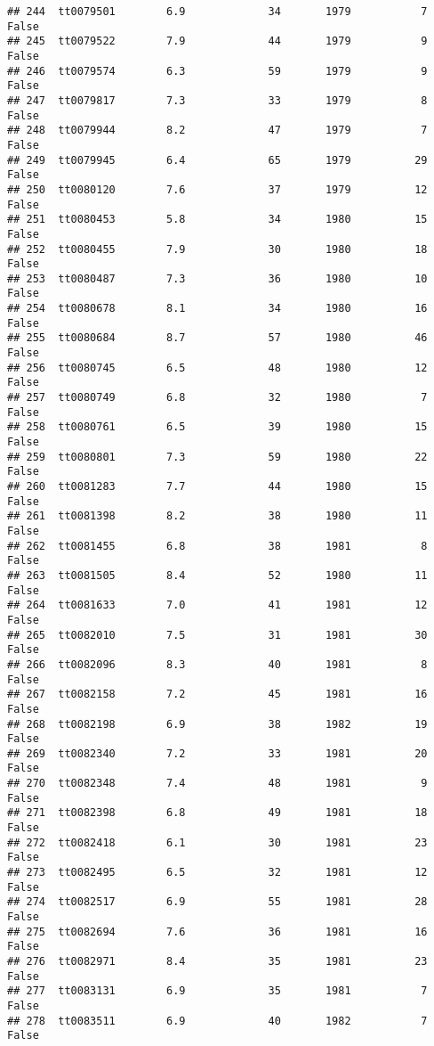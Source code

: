 \documentclass[
]{article}
\begin{document}
\begin{verbatim}
## 244  tt0079501        6.9             34       1979           7   False
## 245  tt0079522        7.9             44       1979           9   False
## 246  tt0079574        6.3             59       1979           9   False
## 247  tt0079817        7.3             33       1979           8   False
## 248  tt0079944        8.2             47       1979           7   False
## 249  tt0079945        6.4             65       1979          29   False
## 250  tt0080120        7.6             37       1979          12   False
## 251  tt0080453        5.8             34       1980          15   False
## 252  tt0080455        7.9             30       1980          18   False
## 253  tt0080487        7.3             36       1980          10   False
## 254  tt0080678        8.1             34       1980          16   False
## 255  tt0080684        8.7             57       1980          46   False
## 256  tt0080745        6.5             48       1980          12   False
## 257  tt0080749        6.8             32       1980           7   False
## 258  tt0080761        6.5             39       1980          15   False
## 259  tt0080801        7.3             59       1980          22   False
## 260  tt0081283        7.7             44       1980          15   False
## 261  tt0081398        8.2             38       1980          11   False
## 262  tt0081455        6.8             38       1981           8   False
## 263  tt0081505        8.4             52       1980          11   False
## 264  tt0081633        7.0             41       1981          12   False
## 265  tt0082010        7.5             31       1981          30   False
## 266  tt0082096        8.3             40       1981           8   False
## 267  tt0082158        7.2             45       1981          16   False
## 268  tt0082198        6.9             38       1982          19   False
## 269  tt0082340        7.2             33       1981          20   False
## 270  tt0082348        7.4             48       1981           9   False
## 271  tt0082398        6.8             49       1981          18   False
## 272  tt0082418        6.1             30       1981          23   False
## 273  tt0082495        6.5             32       1981          12   False
## 274  tt0082517        6.9             55       1981          28   False
## 275  tt0082694        7.6             36       1981          16   False
## 276  tt0082971        8.4             35       1981          23   False
## 277  tt0083131        6.9             35       1981           7   False
## 278  tt0083511        6.9             40       1982           7   False

\end{verbatim}
\end{document}
